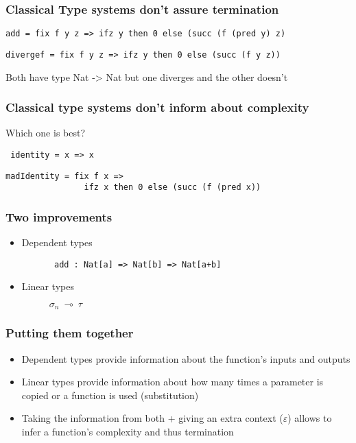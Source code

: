 \documentclass{beamer}
\begin{document}
\begin{frame}[fragile]
\frametitle{Classical Type systems don't assure termination}


\begin{verbatim}
add = fix f y z => ifz y then 0 else (succ (f (pred y) z)
\end{verbatim}

\begin{verbatim}
divergef = fix f y z => ifz y then 0 else (succ (f y z))
\end{verbatim}
Both have type Nat -> Nat but one diverges and the other doesn't
\end{frame}

\begin{frame}[fragile]
\frametitle{Classical type systems don't inform about complexity}
Which one is best? 
\begin{verbatim}
 identity = x => x 
\end{verbatim}
\begin{verbatim}
madIdentity = fix f x => 
                ifz x then 0 else (succ (f (pred x))
\end{verbatim}
\end{frame}

\begin{frame}[fragile]
\frametitle{Two improvements}
\begin{itemize}
\item Dependent types
\begin{figure}
\begin{verbatim}
 add : Nat[a] => Nat[b] => Nat[a+b]
\end{verbatim}
\end{figure}
\item Linear types \\
\begin{figure}
\begin{center}
$\sigma_{n}~\multimap~\tau$
\end{center}
\end{figure}
\end{itemize}
\end{frame}

\begin{frame}[fragile]
\frametitle{Putting them together}
\begin{itemize}
\item Dependent types provide information about the function's inputs and outputs

\item Linear types provide information about how many times a parameter is
  copied or a function is used (substitution)

\item Taking the information from both + giving an extra context
($\varepsilon$) allows to infer a function's complexity and thus termination
\end{itemize}
\end{frame}
\end{document}
